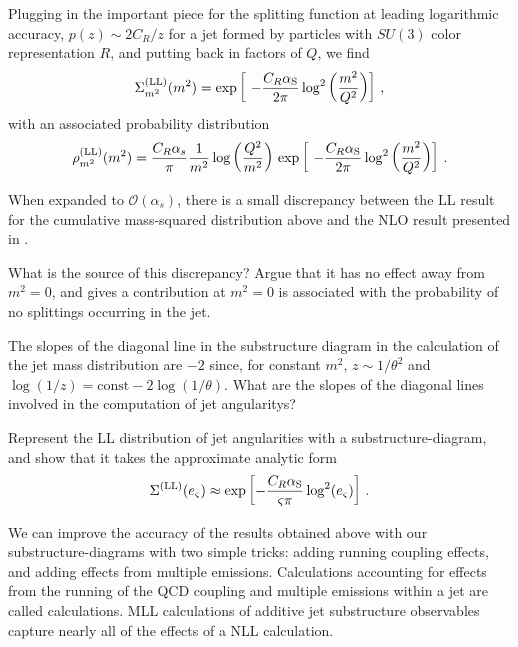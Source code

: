 \begin{example}
Plugging in the important piece for the splitting function at leading logarithmic accuracy, \(p(z) \sim 2 C_R / z\) for a jet formed by particles with \(SU(3)\) color representation \(R\), and putting back in factors of \(Q\), we find
\begin{align}
    \Sigma^{\rm(LL)}_{m^2}(m^2)
    =
    \exp\left[~-\frac{C_R\alpha_{\rm S}}{2 \pi}\log^2\left(\frac{m^2}{Q^2}\right)\right]
    \,,
\end{align}
%
%
with an associated probability distribution
\begin{align}
    \rho^{\rm(LL)}_{m^2}(m^2)
    =
    \frac{C_R \alpha_s}{\pi}
    \frac{1}{m^2}
    \log\left(\frac{Q^2}{m^2}\right)
    \,
    \exp\left[~-\frac{C_R\alpha_{\rm S}}{2 \pi}\log^2\left(\frac{m^2}{Q^2}\right)\right]
    \,.
\end{align}
\end{example}

\begin{exercise}
    When expanded to \(\mathcal{O}(\alpha_s)\), there is a small discrepancy between the LL result for the cumulative mass-squared distribution above and the NLO result presented in .

    What is the source of this discrepancy?
    Argue that it has no effect away from \(m^2 = 0\), and gives a contribution at \(m^2 = 0\) is associated with the probability of no splittings occurring in the jet.
\end{exercise}


\begin{exercise}
    The slopes of the diagonal line in the substructure diagram in the calculation of the jet mass distribution are \(-2\) since, for constant \(m^2\), \(z \sim 1/\theta^2\) and \(\log(1/z) = \text{const} - 2 \log(1/\theta)\).
    What are the slopes of the diagonal lines involved in the computation of jet \glspl{angularity}?

    Represent the LL distribution of jet angularities with a \gls{substructure-diagram}, and show that it takes the approximate analytic form
    \begin{align}
        \Sigma^{(\text{LL})}(e_\varsigma)
        \approx
        \exp\left[
            -\frac{C_R\alpha_{\rm S}}{\varsigma \pi}\log^2(e_\varsigma)
        \right]
        \,.
    \end{align}
\end{exercise}

We can improve the accuracy of the results obtained above with our \glspl{substructure-diagram} with two simple tricks:
%
adding running coupling effects, and adding effects from multiple emissions.
%
Calculations accounting for effects from the running of the QCD coupling and multiple emissions within a jet are called  calculations.
%
MLL calculations of additive jet substructure observables capture nearly all of the effects of a NLL calculation.

